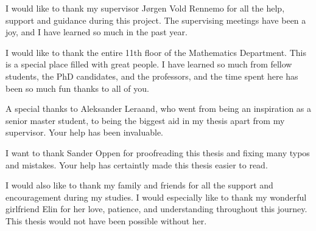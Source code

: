 
I would like to thank my supervisor Jørgen Vold Rennemo for all the help, support and guidance during this project. The supervising meetings have been a joy, and I have learned so much in the past year.

I would like to thank the entire 11th floor of the Mathematics Department. This is a special place filled with great people. I have learned so much from fellow students, the PhD candidates, and the professors, and the time spent here has been so much fun thanks to all of you. 

A special thanks to Aleksander Leraand, who went from being an inspiration as a senior master student, to being the biggest aid in my thesis apart from my supervisor. Your help has been invaluable.

I want to thank Sander Oppen for proofreading this thesis and fixing many typos and mistakes. Your help has certaintly made this thesis easier to read.

I would also like to thank my family and friends for all the support and encouragement during my studies. I would especially like to thank my wonderful girlfriend Elin for her love, patience, and understanding throughout this journey. This thesis would not have been possible without her.

